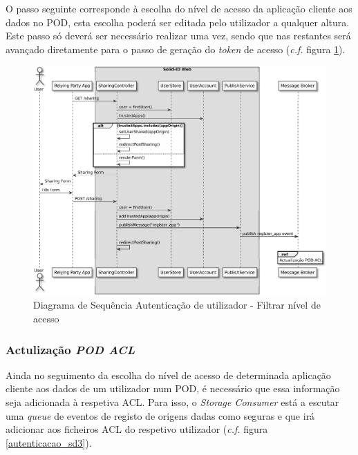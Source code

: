 O passo seguinte corresponde à escolha do nível de acesso da aplicação cliente aos dados no POD, esta escolha poderá ser editada pelo utilizador a qualquer altura.
Este passo só deverá ser necessário realizar uma vez, sendo que nas restantes será avançado diretamente para o passo de geração do \emph{token} de acesso (\emph{c.f.} figura \ref{autenticacao_sd2}).

\begin{figure}[H]
    \begin{center}
    \includegraphics[width=1 \textwidth]{figures/authentication_sd_2.eps}
    \caption{Diagrama de Sequência Autenticação de utilizador - Filtrar nível de acesso}
            \label{autenticacao_sd2}
    \end{center}
\end{figure}

\subsubsection{Actulização \emph{POD ACL}}

Ainda no seguimento da escolha do nível de acesso de determinada aplicação cliente aos dados de um utilizador num POD, é necessário que essa informação seja adicionada à respetiva ACL. Para isso, o \emph{Storage Consumer} está a escutar uma \emph{queue} de eventos de registo de origens dadas como seguras e que irá adicionar aos ficheiros ACL do respetivo utilizador (\emph{c.f.} figura \ref{autenticacao_sd3}).

